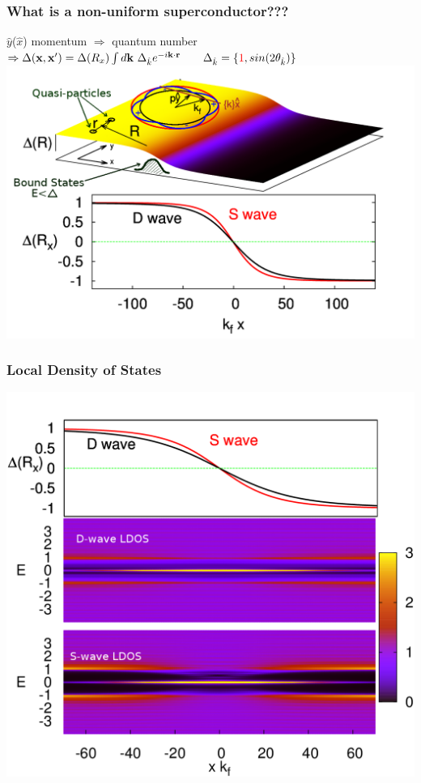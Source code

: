 \documentclass[amssymb,amsmath]{beamer}
\newcommand{\red}{\textcolor{red}}
\begin{document}
\begin{frame}
\frametitle{What is a non-uniform superconductor???}
\centering
$\hat{y}$($\hat{x}$) momentum $\Rightarrow$  quantum number \\$\Rightarrow \Delta(\vx,\vx') = \Delta(R_x)  \int d\vk \,\,\Delta_{\hk} e^{-i\vk\cdot\vr}\quad\quad \Delta_{\hk} = \{\red{1}, sin(2\theta_{\hk})\}$ \\
\centering
 \includegraphics[scale=0.27]{./figures_3/fig1/Fig1_0.png}
\end{frame}
\begin{frame}
\frametitle{Local Density of States}
\includegraphics[scale=0.22]{./figures_3/fig1/Fig1.png}   
\end{frame}
\end{document}
